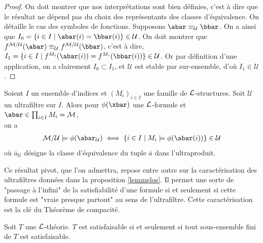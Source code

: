 \begin{proof}
On doit montrer que nos interprétations sont bien définies, c'est à dire que le résultat ne dépend pas du choix des représentants des classes d'équivalence.
On détaille le cas des symboles de fonctions.
Supposons $\abar \equiv_{\mathcal{U}} \bbar$. On a ainsi que $I_0 = \{ i \in I \mid \abar(i) = \bbar(i) \} \in \mathcal{U}$.
On doit montrer que $f^{\cM/\mathcal{U}}(\abar) \equiv_{\mathcal{U}} f^{\cM/\mathcal{U}}(\bbar)$, c'est à dire,
$I_1 = \{ i \in I \mid f^{M_i}(\abar(i)) = f^{M_i}(\bbar(i)) \} \in \mathcal{U}$. Or par définition d'une application,
on a clairement $I_0 \subset I_1$, et $\mathcal{U}$ est stable par sur-ensemble, d'où $I_1 \in \mathcal{U}$.
\end{proof}


\begin{theo}[Théorème de \L{}oś]
Soient $I$ un ensemble d'indices et $(M_i)_{i \in I}$ une famille de $\mathcal{L}$-structures. Soit $\mathcal{U}$ un ultrafiltre sur $I$.
Alors pour $\phi(\xbar)$ une $\mathcal{L}$-formule et $\abar \in \prod_{i \in I} M_i = \mathcal{M}$,\\on a
\begin{align*}
\mathcal{M}/\mathcal{U} \models \phi(\abar_{\mathcal{U}}) \iff \{ i \in I \mid M_i \models \phi(\abar(i)) \} \in \mathcal{U}
\end{align*}
où $\bar{a}_\mathcal{U}$ désigne la classe d'équivalence du tuple $\bar{a}$ dans l'ultraproduit.
\end{theo}

\begin{rema}
Ce résultat pivot, que l'on admettra, repose entre autre sur la caractérisation des ultrafiltres données dans la proposition \ref{lemmelos}.
Il permet une sorte de "passage à l'infini" de la satisfiabilité d'une formule si et seulement si
cette formule est "vraie presque partout" au sens de l'ultrafiltre. Cette caractérisation est la clé du Théorème de compacité.
\end{rema}

\begin{theo}\label{theo-compacite}
Soit $T$ une $\mathcal{L}$-théorie. $T$ est satisfaisable si et seulement si tout sous-ensemble fini de $T$ est satisfaisable.
\end{theo}

